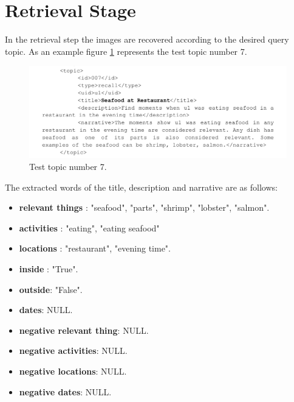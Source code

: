 \newpage
\section{Retrieval Stage}
\label{sec:retrieval}

    In the retrieval step the images are recovered according to the desired query topic.
    As an example figure \ref{fig:testtopic} represents the test topic number 7.
   
    \begin{figure}[H]
        \centering
        \captionsetup{justification=centering}
        \includegraphics[width = \textwidth]{Sections/6textprocessing/images/topic.png}
        \caption{Test topic number 7.}
        \label{fig:testtopic}
      \end{figure}
      
      The extracted words of the title, description and narrative are as follows:

      \begin{itemize}
        \itemsep0em
        \item \textbf{relevant things} : 
            "seafood",
            "parts",
            "shrimp",
            "lobster",
            "salmon".
        \item \textbf{activities} : "eating",
        "eating seafood"
        \item \textbf{locations} : "restaurant",  "evening time".
        \item \textbf{inside} : "True".
        \item \textbf{outside}: "False".
        \item \textbf{dates}: NULL.
        \item \textbf{negative relevant thing}: NULL.
        \item \textbf{negative activities}: NULL.
        \item \textbf{negative locations}:  NULL.
        \item \textbf{negative dates}: NULL.
       
    \end{itemize}


